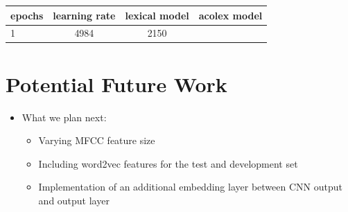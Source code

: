 \documentclass[a0,landscape]{a0poster}
\begin{document}
\begin{multicols}{3}
\large
\begin{tabular}{ l | c | c | c }
	epochs & learning rate & lexical model & acolex model \\
	\hline
	1 & 4984 & 2150  \\
\end{tabular}
\normalsize

\section*{Potential Future Work}

\begin{itemize}
	\item What we plan next:
	\begin{itemize}
		\item Varying MFCC feature size 
		\item Including word2vec features for the test and development set
		\item Implementation of an additional embedding layer between CNN output and output layer
	
	\end{itemize}		
\end{itemize}


%
%
%
%
%

\end{multicols}
\end{document}
